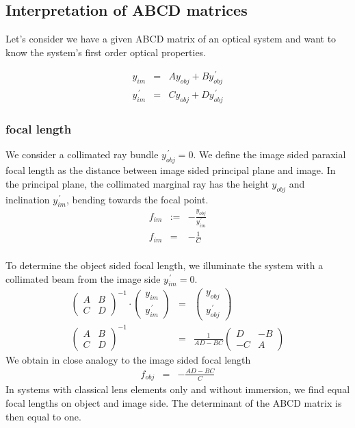\documentclass[12pt,a4paper,twoside,openright,BCOR10mm,headsepline,titlepage,abstracton,chapterprefix,final]{scrreprt}
\begin{document}
\subsection{Interpretation of ABCD matrices}
Let's consider we have a given ABCD matrix of an optical system and want to know the system's first order optical properties.

\begin{eqnarray}
  y_{im} &=& A y_{obj} + B y_{obj}^{\,\prime}
  \\ 
  y_{im}^{\,\prime} &=& C y_{obj} + D y_{obj}^{\,\prime}
\end{eqnarray}

\subsubsection{focal length}
We consider a collimated ray bundle $y_{obj}^{\,\prime} = 0$.
We define the image sided paraxial focal length as the distance between image sided principal plane and image.
In the principal plane, the collimated marginal ray has the height $y_{obj}$ and inclination $y_{im}^{\,\prime}$, bending towards the focal point.
\begin{eqnarray}
 f_{im} &:=& - \frac{ y_{obj} }{ y_{im}^{\,\prime} } 
 \\
 f_{im} &=& - \frac{ 1 }{ C } \\ 
\end{eqnarray}

To determine the object sided focal length, we illuminate the system with a collimated beam from the image side $y_{im}^{\,\prime}=0$.
\begin{eqnarray}
 \begin{pmatrix}
  A & B \\ C & D
 \end{pmatrix}^{-1}
 \cdot
 \begin{pmatrix}
  y_{im} \\ y_{im}^{\,\prime}
 \end{pmatrix}
 &=&
 \begin{pmatrix}
  y_{obj} \\ y_{obj}^{\,\prime}
 \end{pmatrix}
\\
  \begin{pmatrix}
  A & B \\ C & D
 \end{pmatrix}^{-1}
 &=&
 \frac{1}{AD-BC}
  \begin{pmatrix}
  D & - B \\ -C & A
 \end{pmatrix}
\end{eqnarray}
We obtain in close analogy to the image sided focal length
\begin{eqnarray}
 f_{obj} &=& - \frac{AD-BC}{C}
\end{eqnarray}
In systems with classical lens elements only and without immersion, 
we find equal focal lengths on object and image side. The determinant of the ABCD matrix is then equal to one.
\end{document}
